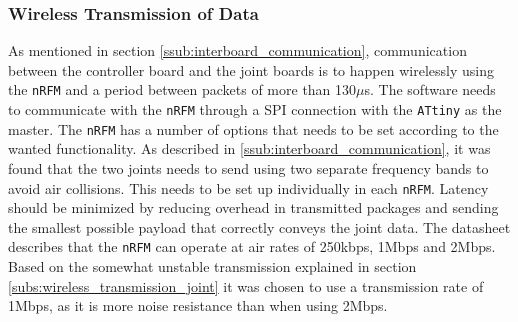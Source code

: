 \subsubsection{Wireless Transmission of Data}
As mentioned in section \ref{ssub:interboard_communication}, communication between the controller board and the joint boards is to happen wirelessly using the \texttt{nRFM} and a period between packets of more than 130$\mu$s.
The software needs to communicate with the \texttt{nRFM} through a SPI connection with the \texttt{ATtiny} as the master.
The \texttt{nRFM} has a number of options that needs to be set according to the wanted functionality.
As described in \ref{ssub:interboard_communication}, it was found that the two joints needs to send using two separate frequency bands to avoid air collisions. 
This needs to be set up individually in each \texttt{nRFM}. 
Latency should be minimized by reducing overhead in transmitted packages and sending the smallest possible payload that correctly conveys the joint data.
The datasheet describes that the \texttt{nRFM} can operate at air rates of 250kbps, 1Mbps and 2Mbps.
Based on the somewhat unstable transmission explained in section \ref{subs:wireless_transmission_joint} it was chosen to use a transmission rate of 1Mbps, as it is more noise resistance than when using 2Mbps.

